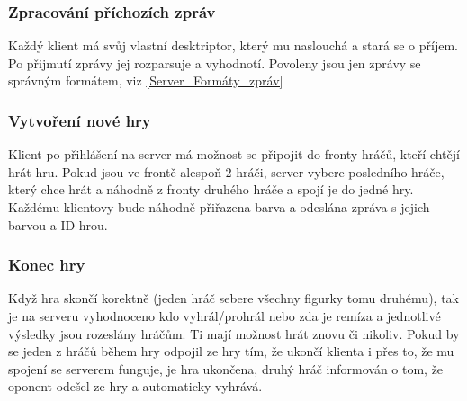 \documentclass[12pt, a4paper]{article}
\begin{document}
\subsubsection{Zpracování příchozích zpráv}
\label{Server_Zpracování_příchozích_zpráv}
Každý klient má svůj vlastní desktriptor, který mu naslouchá a stará se o příjem. Po přijmutí zprávy jej rozparsuje a vyhodnotí. Povoleny jsou jen zprávy se správným formátem, viz \ref{Server_Formáty_zpráv}
\subsubsection{Vytvoření nové hry}
\label{Vytvoření_nové_hry}
Klient po přihlášení na server má možnost se připojit do fronty hráčů, kteří chtějí hrát hru. Pokud jsou ve frontě alespoň 2 hráči, server vybere posledního hráče, který chce hrát a náhodně z fronty druhého hráče a spojí je do jedné hry. Každému klientovy bude náhodně přiřazena barva a odeslána zpráva s jejich barvou a ID hrou.
\subsubsection{Konec hry}
\label{Konec_hry}
Když hra skončí korektně (jeden hráč sebere všechny figurky tomu druhému), tak je na serveru vyhodnoceno kdo vyhrál/prohrál nebo zda je remíza a jednotlivé výsledky jsou rozeslány hráčům. Ti mají možnost hrát znovu či nikoliv. Pokud by se jeden z hráčů během hry odpojil ze hry tím, že ukončí klienta i přes to, že mu spojení se serverem funguje, je hra ukončena, druhý hráč informován o tom, že oponent odešel ze hry a automaticky vyhrává.
\end{document}
